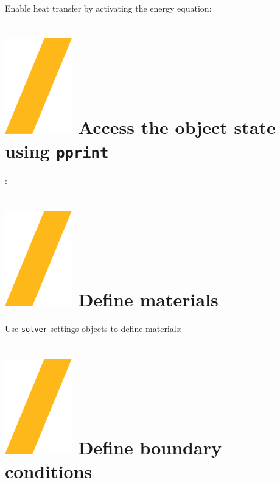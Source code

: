 \documentclass[9pt,landscape]{article}
\begin{document}
\begin{multicols}{3}
Enable heat transfer by activating the energy equation:


\section{\includegraphics[height=\fontcharht\font`\S]{slash.png} Access the object state using \texttt{pprint}}:

\vfill

\vfill
\section{\includegraphics[height=\fontcharht\font`\S]{slash.png}  Define materials}
Use \texttt{solver} settings objects to define materials:

\section{\includegraphics[height=\fontcharht\font`\S]{slash.png}  Define boundary conditions}


\end{multicols}
\end{document}
